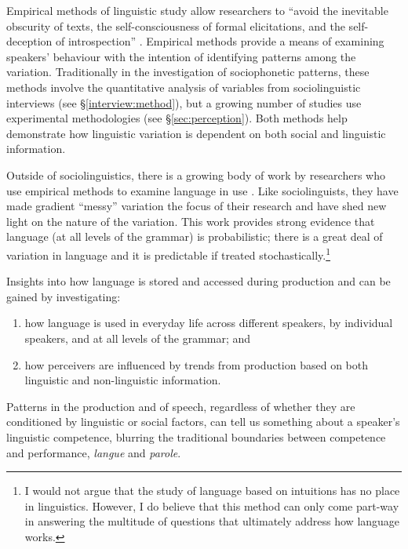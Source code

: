 Empirical methods of linguistic study allow researchers to ``avoid the inevitable obscurity of texts, the self-con\-scious\-ness of formal elicitations, and the self-decep\-tion of introspection'' \citep[xix]{labov1972sociolingpatterns}. Empirical methods provide a means of examining speakers' behaviour with the intention of identifying patterns among the variation. Traditionally in the investigation of sociophonetic patterns, these methods involve the quantitative analysis of variables from sociolinguistic interviews (see \S \ref{interview:method}), but a growing number of studies use experimental methodologies (see \S \ref{sec:perception}). Both methods help demonstrate how linguistic variation is dependent on both social and linguistic information.


Outside of sociolinguistics, there is a growing body of work by researchers who use empirical methods to examine language in use \citep{bodetal2003}. Like sociolinguists, they have made gradient ``messy'' variation the focus of their research and have shed new light on the nature of the variation. This work provides strong evidence that language (at all levels of the grammar) is probabilistic; there is a great deal of variation in language and it is predictable if treated stochastically.\footnote{I would not argue that the study of language based on intuitions has no place in linguistics. However, I do believe that this method can only come part-way in answering the multitude of questions that ultimately address how language works.}

Insights into how language is stored and accessed during production and  can be gained by investigating: \nocite{saussure1916}  

\begin{enumerate}
	\item how language is used in everyday life across different speakers, by individual speakers, and at all levels of the grammar; and
	\item how perceivers are influenced by trends from production based on both linguistic and non-linguistic information.
\end{enumerate}

\noindent Patterns in the production and  of speech, regardless of whether they are conditioned by linguistic or social factors, can tell us something about a speaker's linguistic competence, blurring the traditional boundaries between competence and performance, \textit{langue} and \textit{parole}. 



